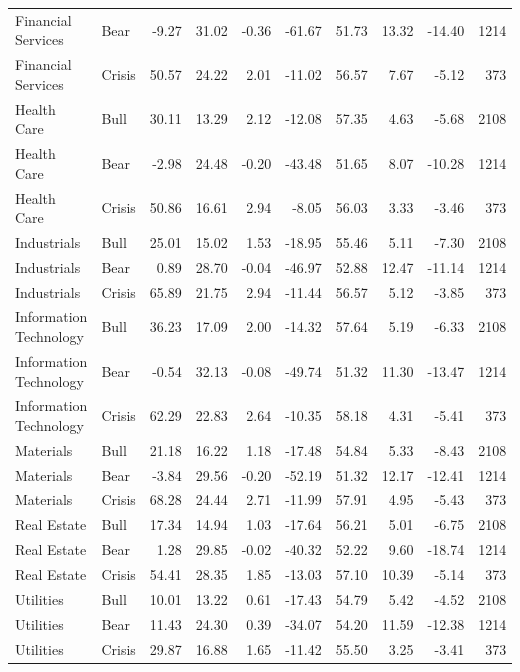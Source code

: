 \begin{landscape}
\begin{longtable}{llrrrrrrrr}
Financial Services & Bear & -9.27 & 31.02 & -0.36 & -61.67 & 51.73 & 13.32 & -14.40 & 1214 \\
Financial Services & Crisis & 50.57 & 24.22 & 2.01 & -11.02 & 56.57 & 7.67 & -5.12 & 373 \\
Health Care & Bull & 30.11 & 13.29 & 2.12 & -12.08 & 57.35 & 4.63 & -5.68 & 2108 \\
Health Care & Bear & -2.98 & 24.48 & -0.20 & -43.48 & 51.65 & 8.07 & -10.28 & 1214 \\
Health Care & Crisis & 50.86 & 16.61 & 2.94 & -8.05 & 56.03 & 3.33 & -3.46 & 373 \\
Industrials & Bull & 25.01 & 15.02 & 1.53 & -18.95 & 55.46 & 5.11 & -7.30 & 2108 \\
Industrials & Bear & 0.89 & 28.70 & -0.04 & -46.97 & 52.88 & 12.47 & -11.14 & 1214 \\
Industrials & Crisis & 65.89 & 21.75 & 2.94 & -11.44 & 56.57 & 5.12 & -3.85 & 373 \\
Information Technology & Bull & 36.23 & 17.09 & 2.00 & -14.32 & 57.64 & 5.19 & -6.33 & 2108 \\
Information Technology & Bear & -0.54 & 32.13 & -0.08 & -49.74 & 51.32 & 11.30 & -13.47 & 1214 \\
Information Technology & Crisis & 62.29 & 22.83 & 2.64 & -10.35 & 58.18 & 4.31 & -5.41 & 373 \\
Materials & Bull & 21.18 & 16.22 & 1.18 & -17.48 & 54.84 & 5.33 & -8.43 & 2108 \\
Materials & Bear & -3.84 & 29.56 & -0.20 & -52.19 & 51.32 & 12.17 & -12.41 & 1214 \\
Materials & Crisis & 68.28 & 24.44 & 2.71 & -11.99 & 57.91 & 4.95 & -5.43 & 373 \\
Real Estate & Bull & 17.34 & 14.94 & 1.03 & -17.64 & 56.21 & 5.01 & -6.75 & 2108 \\
Real Estate & Bear & 1.28 & 29.85 & -0.02 & -40.32 & 52.22 & 9.60 & -18.74 & 1214 \\
Real Estate & Crisis & 54.41 & 28.35 & 1.85 & -13.03 & 57.10 & 10.39 & -5.14 & 373 \\
Utilities & Bull & 10.01 & 13.22 & 0.61 & -17.43 & 54.79 & 5.42 & -4.52 & 2108 \\
Utilities & Bear & 11.43 & 24.30 & 0.39 & -34.07 & 54.20 & 11.59 & -12.38 & 1214 \\
Utilities & Crisis & 29.87 & 16.88 & 1.65 & -11.42 & 55.50 & 3.25 & -3.41 & 373 \\
\end{longtable}
\end{landscape}

